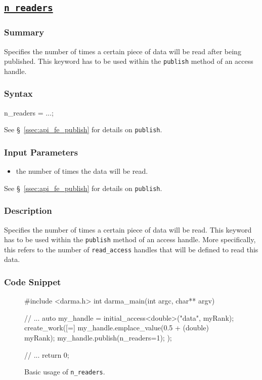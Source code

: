 \clearpage
\subsection{\underline{\texttt{n\_readers}}}

\hspace{0.1cm} %
\begin{subs}
\vspace{-1.2cm}

\subsubsection{Summary} 
Specifies the number of times a certain piece of 
data will be read after being published. This keyword has to be used within 
the \texttt{publish} method of an access handle.


\subsubsection{Syntax} 
\begin{CppCode}
n_readers = ...; 
\end{CppCode}
See \S~\ref{ssec:api_fe_publish} for details on \texttt{publish}.


\subsubsection{Input Parameters} 
\begin{itemize}
\item the number of times the data will be read.
\end{itemize}
See \S~\ref{ssec:api_fe_publish} for details on \texttt{publish}.


\subsubsection{Description} 
Specifies the number of times a certain piece of 
data will be read. This keyword has to be used within 
the \texttt{publish} method of an access handle.
More specifically, this refers to the number of \texttt{read\_access} 
handles that will be defined to read this data.


\subsubsection{Code Snippet} 
\begin{figure}[!h]
\begin{CppCodeNumb}
#include <darma.h>
int darma_main(int argc, char** argv)
{
	// ...
  auto my_handle = initial_access<double>("data", myRank);
  create_work([=]
  {
    my_handle.emplace_value(0.5 + (double) myRank);
    my_handle.publish(n_readers=1);
  });

  // ... 
  return 0;
}
\end{CppCodeNumb}
\label{fig:fe_api_initialaccess}
\caption{Basic usage of \texttt{n\_readers}.}
\end{figure}

\end{subs}






